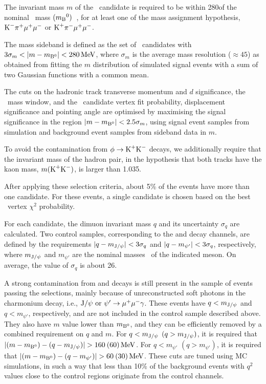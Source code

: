 The invariant mass $m$ of the \PBz\ candidate is required to be within 280\MeV of the nominal \PBz\ mass $(m_{\textrm{B}}{}^{0})$~\cite{PDG}, for at least one of the mass assignment hypothesis, $\textrm{K}^{-}\pi^{+}\mu^{+}\mu^{-}$ or $\textrm{K}^{+}\pi^{-}\mu^{+}\mu^{-}$.

The mass sideband is defined as the set of \PBz\ candidates with $3\sigma_m < \lvert m-m_{{\textrm{B}}{}^{0}}\rvert < 280\,\textrm{MeV}$, where $\sigma_m$ is the average mass resolution (${\approx}45$\MeV) as obtained from fitting the $m$ distribution of simulated signal events with a sum of two Gaussian functions with a common mean.

The cuts on the hadronic track transverse momentum and $d$ significance, the \cPKstz\ mass window, and the \PBz\ candidate vertex fit probability, displacement significance and pointing angle are optimised by maximising the signal significance in the region $\lvert m-m_{{\textrm{B}}{}^{0}}\rvert < 2.5\sigma_m$, using signal event samples from simulation and background event samples from sideband data in $m$.

To avoid the contamination from $\phi\to\textrm{K}^{+}\textrm{K}^{-}$ decays, we additionally require that the invariant mass of the hadron pair, in the hypothesis that both tracks have the kaon mass, $m(\textrm{K}^{+}\textrm{K}^{-})$, is larger than 1.035\GeV.

After applying these selection criteria, about 5\% of the events have more than one candidate.
For these events, a single candidate is chosen based on the best \PBz\ vertex $\chi^2$ probability.

For each candidate, the dimuon invariant mass $q$ and its uncertainty $\sigma_{q}$ are calculated.
Two control samples, corresponding to the \BtoKstJpsi and \BtoKstpsip decay channels, are defined by the requirements $\lvert q - m_{\textrm{J}/\psi}\rvert < 3\sigma_{q}$ and $\lvert q - m_{\psi'}\rvert < 3\sigma_{q}$, respectively, where $m_{\textrm{J}/\psi}$ and $m_{\psi'}$ are the nominal masses~\cite{PDG} of the indicated meson.
On average, the value of $\sigma_{q}$ is about 26\MeV.

A strong contamination from \BtoKstJpsi and \BtoKstpsip decays is still present in the sample of events passing the selections, mainly because of unreconstructed soft photons in the charmonium decay, i.e., $\textrm{J}/\psi\ {\rm or}\ \psi' \to \mu^{+} \mu^{-} \gamma$.
These events have $q<m_{\textrm{J}/\psi}$ and $q<m_{\psi'}$, respectively, and are not included in the control sample described above.
They also have $m$ value lower than $m_{{\textrm{B}}{}^{0}}$, and they can be efficiently removed by a combined requirement on $q$ and $m$.
For $q<m_{\textrm{J}/\psi}$ $(q>m_{\textrm{J}/\psi})$, it is required that $\lvert(m-m_{{\textrm{B}}{}^{0}})-(q-m_{\textrm{J}/\psi})\rvert>160\: (60)\,\textrm{MeV}$.
For $q<m_{\psi'}$ $(q>m_{\psi'})$, it is required that $\lvert(m-m_{{\textrm{B}}{}^{0}})-(q-m_{\psi'})\rvert>60\: (30)\,\textrm{MeV}$.
These cuts are tuned using MC simulations, in such a way that less than 10\% of the background events with $q^2$ values close to the control regions originate from the control channels.

